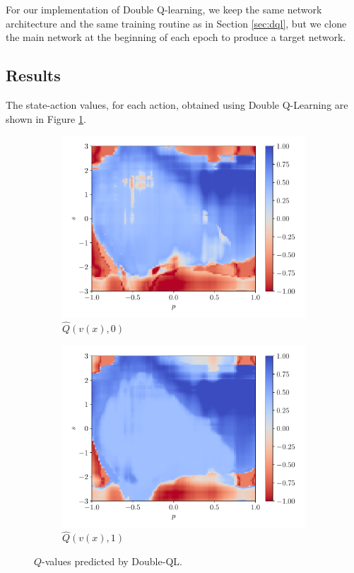 \documentclass[a4paper, 12pt]{article}
\begin{document}
    For our implementation of Double Q-learning, we keep the same network architecture and the same training routine as in Section \ref{sec:dql}, but we clone the main network at the beginning of each epoch to produce a target network.
    
    \subsection{Results}
    
    The state-action values, for each action, obtained using Double Q-Learning are shown in Figure \ref{fig:dqn.hat.q}.
    
    \begin{figure}[h]
        \centering
        \begin{subfigure}{0.49\textwidth}
            \centering
            \includegraphics[width=\textwidth]{resources/pdf/4_dqn_q0.pdf}
            \caption{$\hat{Q}(v(x), 0)$}
        \end{subfigure}
        \hfill
        \begin{subfigure}{0.49\textwidth}
            \centering
            \includegraphics[width=\textwidth]{resources/pdf/4_dqn_q1.pdf}
            \caption{$\hat{Q}(v(x), 1)$}
        \end{subfigure}
        \caption{$Q$-values predicted by Double-QL.}
        \label{fig:dqn.hat.q}
    \end{figure}
    
\end{document}
